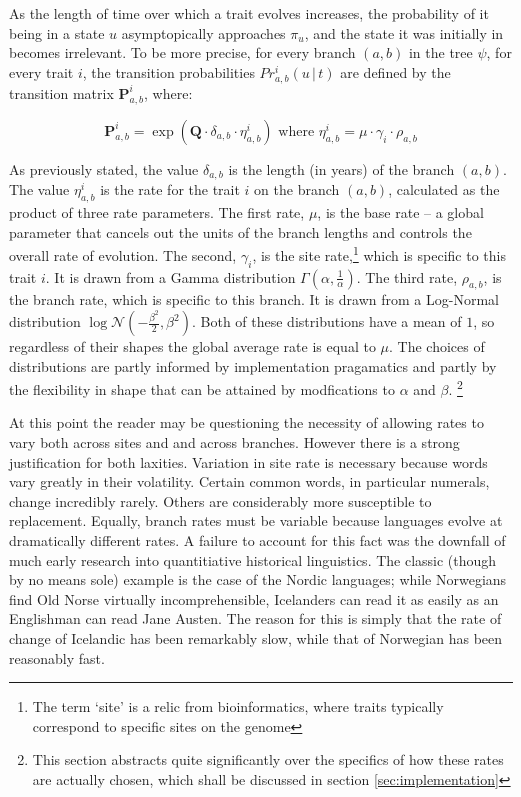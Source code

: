 \documentclass[10pt,journal,compsoc]{IEEEtran}
\begin{document}
As the length of time over which a trait evolves increases, the probability of it being in a state $u$ asymptopically approaches $\pi_u$, and the state it was initially in becomes irrelevant. To be more precise, for every branch $(a, b)$ in the tree $\psi$, for every trait $i$, the transition probabilities $Pr^i_{a,b}\left(u\,\vert\,t\right)$ are defined by the transition matrix $\textbf{P}^i_{a,b}$, where:

\begin{equation}\label{eqn:rate}
\textbf{P}^i_{a,b} = \exp\left(\textbf{Q} \cdot \delta_{a,b} \cdot \eta^i_{a,b}\right) \text{  \ where  \  } \eta^i_{a,b} = \mu \cdot \gamma_i \cdot \rho_{a,b}
\end{equation}

As previously stated, the value $\delta_{a,b}$ is the length (in years) of the branch $(a, b)$. The value $\eta^i_{a,b}$ is the rate for the trait $i$ on the branch $(a, b)$, calculated as the product of three rate parameters. The first rate,  $\mu$, is the base rate -- a global parameter that cancels out the units of the branch lengths and controls the overall rate of evolution. The second, $\gamma_i$, is the site rate,\footnote{The term `site' is a relic from bioinformatics, where traits typically correspond to specific sites on the genome} which is specific to this trait $i$. It is drawn from a Gamma distribution $\Gamma(\alpha, \frac{1}{\alpha})$. The third rate, $\rho_{a,b}$, is the branch rate, which is specific to this branch. It is drawn from a Log-Normal distribution $\log \mathcal{N}(-\frac{\beta^2}{2}, \beta^2)$. Both of these distributions have a mean of $1$, so regardless of their shapes the global average rate is equal to $\mu$. The choices of distributions are partly informed by implementation pragamatics and partly by the flexibility in shape that can be attained by modfications to $\alpha$ and $\beta$. \footnote{This section abstracts quite significantly over the specifics of how these rates are actually chosen, which shall be discussed in section \ref{sec:implementation}}

At this point the reader may be questioning the necessity of allowing rates to vary both across sites and and across branches. However there is a strong justification for both laxities. Variation in site rate is necessary because words vary greatly in their volatility. Certain common words, in particular numerals, change incredibly rarely. Others are considerably more susceptible to replacement. Equally, branch rates must be variable because languages evolve at dramatically different rates. A failure to account for this fact was the downfall of much early research into quantitiative historical linguistics. The classic (though by no means sole) example is the case of the Nordic languages; while Norwegians find Old Norse virtually incomprehensible, Icelanders can read it as easily as an Englishman can read Jane Austen. The reason for this is simply that the rate of change of Icelandic has been remarkably slow, while that of Norwegian has been reasonably fast.
\end{document}
